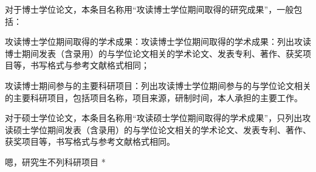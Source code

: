 \achievement

对于博士学位论文，本条目名称用“攻读博士学位期间取得的研究成果”，一般包括：

攻读博士学位期间取得的学术成果：攻读博士学位期间取得的学术成果：列出攻读博士期间发表（含录用）的与学位论文相关的学术论文、发表专利、著作、获奖项目等，书写格式与参考文献格式相同；

攻读博士期间参与的主要科研项目：列出攻读博士学位期间参与的与学位论文相关的主要科研项目，包括项目名称，项目来源，研制时间，本人承担的主要工作。

对于硕士学位论文，本条目名称用“攻读硕士学位期间取得的学术成果”，只列出攻读硕士学位期间发表（含录用）的与学位论文相关的学术论文、发表专利、著作、获奖项目等，书写格式与参考文献格式相同。

\par * 嗯，研究生不列科研项目 * \par